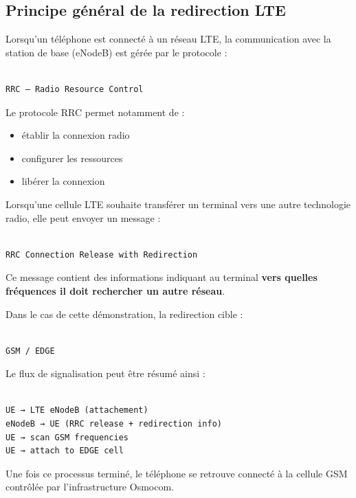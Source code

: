 \documentclass[
  french,
]{article}
\providecommand{\tightlist}{%
  \setlength{\itemsep}{0pt}\setlength{\parskip}{0pt}}
\begin{document}
\subsection{Principe général de la redirection
LTE}\label{principe-guxe9nuxe9ral-de-la-redirection-lte}

Lorsqu'un téléphone est connecté à un réseau LTE, la communication avec
la station de base (eNodeB) est gérée par le protocole :

\begin{verbatim}

RRC — Radio Resource Control
\end{verbatim}

Le protocole RRC permet notamment de :

\begin{itemize}
\tightlist
\item
  établir la connexion radio
\item
  configurer les ressources
\item
  libérer la connexion
\end{itemize}

Lorsqu'une cellule LTE souhaite transférer un terminal vers une autre
technologie radio, elle peut envoyer un message :

\begin{verbatim}

RRC Connection Release with Redirection
\end{verbatim}

Ce message contient des informations indiquant au terminal \textbf{vers
quelles fréquences il doit rechercher un autre réseau}.

Dans le cas de cette démonstration, la redirection cible :

\begin{verbatim}

GSM / EDGE
\end{verbatim}

Le flux de signalisation peut être résumé ainsi :

\begin{verbatim}

UE → LTE eNodeB (attachement)
eNodeB → UE (RRC release + redirection info)
UE → scan GSM frequencies
UE → attach to EDGE cell
\end{verbatim}

Une fois ce processus terminé, le téléphone se retrouve connecté à la
cellule GSM contrôlée par l'infrastructure Osmocom.
\end{document}
